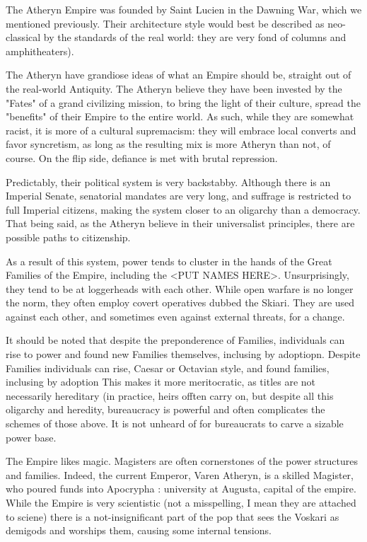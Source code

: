 The Atheryn Empire was founded by Saint Lucien in the Dawning War, which we mentioned previously. Their architecture style would best be described as neo-classical by the standards of the real world: they are very fond of columns and amphitheaters).

The Atheryn have grandiose ideas of what an Empire should be, straight out of the real-world Antiquity. The Atheryn believe they have been invested by the "Fates" of a grand civilizing mission, to bring the light of their culture, spread the "benefits" of their Empire to the entire world. As such, while they are somewhat racist, it is more of a cultural supremacism: they will embrace local converts and favor syncretism, as long as the resulting mix is more Atheryn than not, of course. On the flip side, defiance is met with brutal repression. 

Predictably, their political system is very backstabby. Although there is an Imperial Senate, senatorial mandates are very long, and suffrage is restricted to full Imperial citizens, making the system closer to an oligarchy than a democracy. That being said, as the Atheryn believe in their universalist principles, there are possible paths to citizenship.

As a result of this system, power tends to cluster in the hands of the Great Families of the Empire, including the <PUT NAMES HERE>. Unsurprisingly, they tend to be at loggerheads with each other. While open warfare is no longer the norm, they often employ covert operatives dubbed the Skiari. They are used against each other, and sometimes even against external threats, for a change.

It should be noted that despite the preponderence of Families, individuals can rise to power and found new Families themselves, inclusing by adoptiopn.
Despite Families individuals can rise, Caesar or Octavian style, and found families, inclusing by adoption
This makes it more meritocratic, as titles are not necessarily hereditary (in practice, heirs offten carry on, but despite all this oligarchy and heredity,  bureaucracy is powerful and often complicates the schemes of those above. It is not unheard of for bureaucrats to carve a sizable power base.

The Empire likes magic. Magisters are often cornerstones of the power structures and families. Indeed, the current Emperor, Varen Atheryn, is a skilled Magister, who poured funds into Apocrypha : university at Augusta, capital of the empire. While the Empire is very scientistic (not a misspelling, I mean they are attached to sciene) there is a not-insignificant part of the pop that sees the Voskari as demigods and worships them, causing some internal tensions. 


